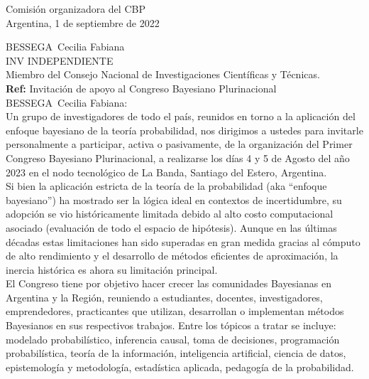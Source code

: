\documentclass[a4paper,11pt]{article}
\begin{document}
\begin{flushright}
Comisión organizadora del CBP \\
Argentina, 1 de septiembre de 2022
\end{flushright} 

\vspace{0.1cm}
\noindent
BESSEGA Cecilia Fabiana\\
INV INDEPENDIENTE \\
Miembro del Consejo Nacional de Investigaciones Científicas y Técnicas.\\[-0.1cm]

\hfill \textbf{Ref:} Invitación de apoyo al Congreso Bayesiano Plurinacional \\

\vspace{0.3cm} \noindent BESSEGA Cecilia Fabiana:\\

\indent Un grupo de investigadores de todo el país, reunidos en torno a la aplicación del enfoque bayesiano de la teoría probabilidad, nos dirigimos a ustedes para invitarle personalmente a participar, activa o pasivamente, de la organización del Primer Congreso Bayesiano Plurinacional, a realizarse los días 4 y 5 de Agosto del año 2023 en el nodo tecnológico de La Banda, Santiago del Estero, Argentina. \\

\indent Si bien la aplicación estricta de la teoría de la probabilidad (aka ``enfoque bayesiano'') ha mostrado ser la lógica ideal en contextos de incertidumbre, su adopción se vio históricamente limitada debido al alto costo computacional asociado (evaluación de todo el espacio de hipótesis). Aunque en las últimas décadas estas limitaciones han sido superadas en gran medida gracias al cómputo de alto rendimiento y el desarrollo de métodos eficientes de aproximación, la inercia histórica es ahora su limitación principal. \\

\indent  El Congreso tiene por objetivo hacer crecer las comunidades Bayesianas en Argentina y la Región, reuniendo a estudiantes, docentes, investigadores, emprendedores, practicantes que utilizan, desarrollan o implementan métodos Bayesianos en sus respectivos trabajos. Entre los tópicos a tratar se incluye: modelado probabilístico, inferencia causal, toma de decisiones, programación probabilística, teoría de la información, inteligencia artificial, ciencia de datos, epistemología y metodología, estadística aplicada, pedagogía de la probabilidad. \\
\end{document}

